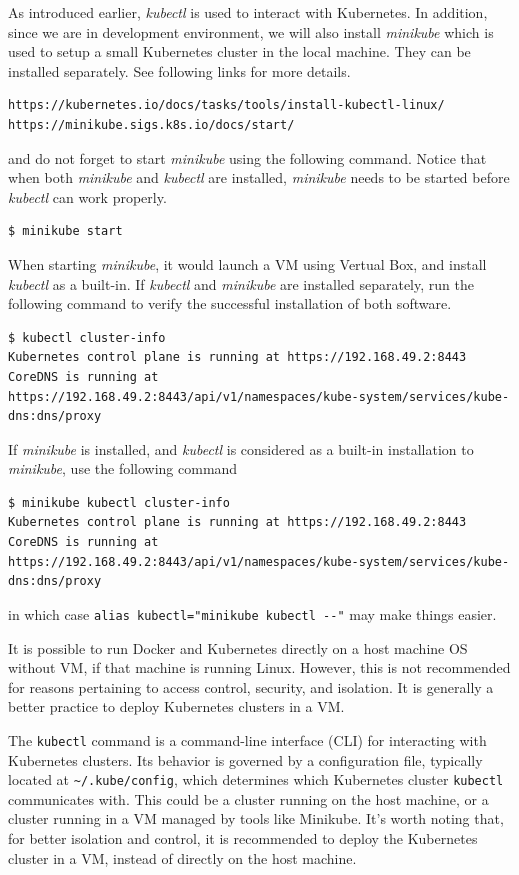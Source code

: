 As introduced earlier, \textit{kubectl} is used to interact with Kubernetes. In addition, since we are in development environment, we will also install \textit{minikube} which is used to setup a small Kubernetes cluster in the local machine. They can be installed separately. See following links for more details.
\begin{lstlisting}
https://kubernetes.io/docs/tasks/tools/install-kubectl-linux/
https://minikube.sigs.k8s.io/docs/start/
\end{lstlisting}
and do not forget to start \textit{minikube} using the following command. Notice that when both \textit{minikube} and \textit{kubectl} are installed, \textit{minikube} needs to be started before \textit{kubectl} can work properly.
\begin{lstlisting}
$ minikube start
\end{lstlisting} 
When starting \textit{minikube}, it would launch a VM using Vertual Box, and install \textit{kubectl} as a built-in. If \textit{kubectl} and \textit{minikube} are installed separately, run the following command to verify the successful installation of both software.
\begin{lstlisting}
$ kubectl cluster-info
Kubernetes control plane is running at https://192.168.49.2:8443
CoreDNS is running at https://192.168.49.2:8443/api/v1/namespaces/kube-system/services/kube-dns:dns/proxy
\end{lstlisting}
If \textit{minikube} is installed, and \textit{kubectl} is considered as a built-in installation to \textit{minikube}, use the following command
\begin{lstlisting}
$ minikube kubectl cluster-info
Kubernetes control plane is running at https://192.168.49.2:8443
CoreDNS is running at https://192.168.49.2:8443/api/v1/namespaces/kube-system/services/kube-dns:dns/proxy
\end{lstlisting}
in which case \verb|alias kubectl="minikube kubectl --"| may make things easier.

It is possible to run Docker and Kubernetes directly on a host machine OS without VM, if that machine is running Linux. However, this is not recommended for reasons pertaining to access control, security, and isolation. It is generally a better practice to deploy Kubernetes clusters in a VM.

The \verb|kubectl| command is a command-line interface (CLI) for interacting with Kubernetes clusters. Its behavior is governed by a configuration file, typically located at \verb|~/.kube/config|, which determines which Kubernetes cluster \verb|kubectl| communicates with. This could be a cluster running on the host machine, or a cluster running in a VM managed by tools like Minikube. It's worth noting that, for better isolation and control, it is recommended to deploy the Kubernetes cluster in a VM, instead of directly on the host machine.

